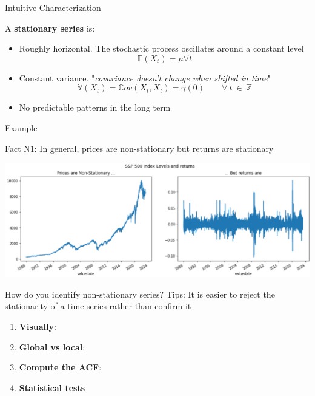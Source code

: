 \documentclass{beamer}
\begin{document}
\begin{frame}{Intuitive Characterization}

A \textbf{stationary series} is:
  \begin{itemize}
  \item Roughly horizontal. The stochastic process oscillates around a constant level
      \begin{equation*}
\mathbb{E}(X_t) = \mu \forall t
\end{equation*}
  \item Constant variance. "\emph{covariance doesn't change when shifted in time}"
    \begin{equation*}
\mathbb{V}(X_t) = \mathbb{C}ov(X_t, X_{t}) = \gamma(0) \qquad \forall \ t \ \in \ \mathbb{Z}
  \end{equation*}
  \item No predictable patterns in the long term
  \end{itemize}
\end{frame}
  
\begin{frame}{Example}
\begin{exampleblock}{Fact N1:}
In general, prices are non-stationary but returns are stationary 
\end{exampleblock}  
\medskip
\centering
\includegraphics[width=\textwidth]{static/course_2_img/SP500_level_ret.PNG}           
\end{frame}

\begin{frame}{How do you identify non-stationary series?}
 Tips: It is easier to reject the stationarity of a time series rather than confirm it
 \medskip
\begin{enumerate}
    \item \textbf{Visually}: 
    \item \textbf{Global vs local}:
    \item \textbf{Compute the ACF}:    
    \item \textbf{Statistical tests}
\end{enumerate}
\end{frame}
\end{document}

